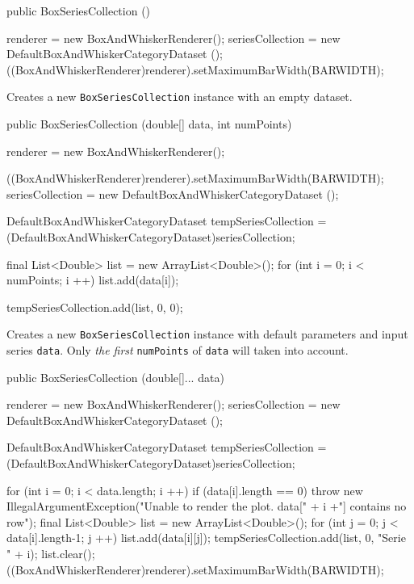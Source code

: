 \begin{code}
   public BoxSeriesCollection () \begin{hide} {
      renderer = new BoxAndWhiskerRenderer();
      seriesCollection = new DefaultBoxAndWhiskerCategoryDataset ();
      ((BoxAndWhiskerRenderer)renderer).setMaximumBarWidth(BARWIDTH);
   }\end{hide}
\end{code}
\begin{tabb}
   Creates a new \texttt{BoxSeriesCollection} instance with an empty dataset.
\end{tabb}
\begin{code}

   public BoxSeriesCollection (double[] data, int numPoints) \begin{hide} {
      renderer = new BoxAndWhiskerRenderer();

      ((BoxAndWhiskerRenderer)renderer).setMaximumBarWidth(BARWIDTH);
      seriesCollection = new DefaultBoxAndWhiskerCategoryDataset ();

      DefaultBoxAndWhiskerCategoryDataset tempSeriesCollection =
            (DefaultBoxAndWhiskerCategoryDataset)seriesCollection;

      final List<Double> list = new ArrayList<Double>();
      for (int i = 0; i < numPoints; i ++)
         list.add(data[i]);

      tempSeriesCollection.add(list, 0, 0);
   }\end{hide}
\end{code}
\begin{tabb}
 Creates a new \texttt{BoxSeriesCollection} instance with default parameters
 and input series \texttt{data}. Only \emph{the first} \texttt{numPoints}
 of \texttt{data} will taken into account.
\end{tabb}
\begin{htmlonly}
\end{htmlonly}
\begin{code}

   public BoxSeriesCollection (double[]... data) \begin{hide} {
      renderer = new BoxAndWhiskerRenderer();
      seriesCollection = new DefaultBoxAndWhiskerCategoryDataset ();

      DefaultBoxAndWhiskerCategoryDataset tempSeriesCollection =
            (DefaultBoxAndWhiskerCategoryDataset)seriesCollection;

      for (int i = 0; i < data.length; i ++) {
         if (data[i].length == 0)
            throw new IllegalArgumentException("Unable to render the plot. data["
                                                   + i +"] contains no row");
         final List<Double> list = new ArrayList<Double>();
         for (int j = 0; j < data[i].length-1; j ++)
            list.add(data[i][j]);
         tempSeriesCollection.add(list, 0, "Serie " + i);
         list.clear();
      }
      ((BoxAndWhiskerRenderer)renderer).setMaximumBarWidth(BARWIDTH);
   }\end{hide}
\end{code}
